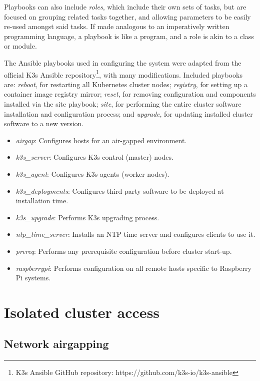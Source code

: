 Playbooks can also include \textit{roles}, which include their own sets of tasks, but are focused on grouping related tasks together, and allowing parameters to be easily re-used amongst said tasks. If made analogous to an imperatively written programming language, a playbook is like a program, and a role is akin to a class or module.


The Ansible playbooks used in configuring the system were adapted from the official K3s Ansible repository\footnote{K3s Ansible GitHub repository: https://github.com/k3s-io/k3s-ansible}, with many modifications. Included playbooks are: \textit{reboot}, for restarting all Kubernetes cluster nodes; \textit{registry}, for setting up a container image registry mirror; \textit{reset}, for removing configuration and components installed via the site playbook; \textit{site}, for performing the entire cluster software installation and configuration process; and \textit{upgrade}, for updating installed cluster software to a new version.

\begin{itemize}[itemsep=0pt]
    \item \textit{airgap}: Configures hosts for an air-gapped environment.
    \item \textit{k3s\_server}: Configures K3s control (master) nodes.
    \item \textit{k3s\_agent}: Configures K3s agents (worker nodes).
    \item \textit{k3s\_deployments}: Configures third-party software to be deployed at installation time.
    \item \textit{k3s\_upgrade}: Performs K3s upgrading process.
    \item \textit{ntp\_time\_server}: Installs an NTP time server and configures clients to use it.
    \item \textit{prereq}: Performs any prerequisite configuration before cluster start-up.
    \item \textit{raspberrypi}: Performs configuration on all remote hosts specific to Raspberry Pi systems.
\end{itemize}

\section{Isolated cluster access}

\subsection{Network airgapping} \label{subsection:airgapping}

